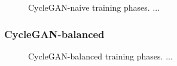 \begin{figure}[h!]
    \centering
    \caption{CycleGAN-naive training phases. ...}
    \label{fig:cyclegan_naive}
\end{figure}{}



\subsubsection{CycleGAN-balanced}

\begin{figure}[h!]
    \centering
    \caption{CycleGAN-balanced training phases. ...}
    \label{fig:cyclegan_balanced}
\end{figure}{}


